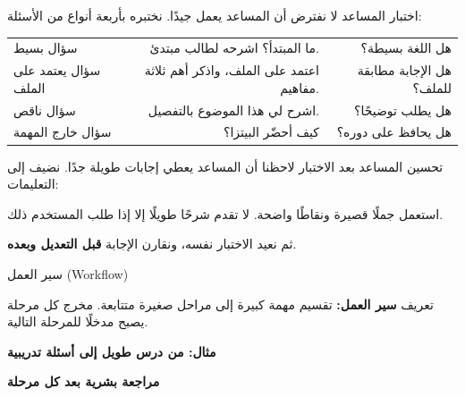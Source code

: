 \documentclass[aspectratio=169, 11pt, xcolor={table}]{beamer}
\begin{document}
\begin{frame}{اختبار المساعد}
    لا نفترض أن المساعد يعمل جيدًا. نختبره بأربعة أنواع من الأسئلة:
    \begin{center}
    \small
    \begin{tabularx}{\textwidth}{|>{\centering\arraybackslash}p{3cm}|R|R|}
        \hline
         &  &  \\ \hline
        سؤال بسيط             & ما المبتدأ؟ اشرحه لطالب مبتدئ. & هل اللغة بسيطة؟ \\ \hline
        سؤال يعتمد على الملف   & اعتمد على الملف، واذكر أهم ثلاثة مفاهيم. & هل الإجابة مطابقة للملف؟ \\ \hline
        سؤال ناقص             & اشرح لي هذا الموضوع بالتفصيل. & هل يطلب توضيحًا؟ \\ \hline
        سؤال خارج المهمة       & كيف أحضّر البيتزا؟ & هل يحافظ على دوره؟ \\ \hline
    \end{tabularx}
    \end{center}
\end{frame}

\begin{frame}{تحسين المساعد بعد الاختبار}
    لاحظنا أن المساعد يعطي إجابات طويلة جدًا. نضيف إلى التعليمات:
    \begin{amr}[brandTeal]
        استعمل جملًا قصيرة ونقاطًا واضحة.
        لا تقدم شرحًا طويلًا إلا إذا طلب المستخدم ذلك.
    \end{amr}
    ثم نعيد الاختبار نفسه، ونقارن الإجابة \textbf{قبل التعديل وبعده}.
\end{frame}

\begin{frame}{سير العمل \textenglish{(Workflow)}}
    \begin{tbox}{\faLightbulb\quad تعريف}
        \textbf{سير العمل:} تقسيم مهمة كبيرة إلى مراحل صغيرة متتابعة.
        مخرج كل مرحلة يصبح مدخلًا للمرحلة التالية.
    \end{tbox}
    \textbf{\color{tealDeep}مثال: من درس طويل إلى أسئلة تدريبية}
    \begin{center}
    \end{center}
    \begin{center}
        \quad \textbf{مراجعة بشرية بعد كل مرحلة}
    \end{center}
\end{frame}
\end{document}

